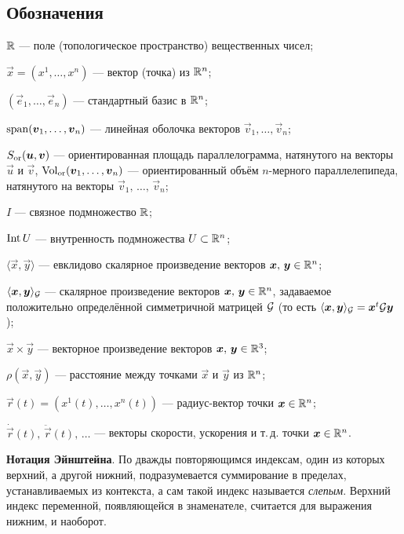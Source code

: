 \subsection*{Обозначения}

\begin{center}
\begin{minipage}{.9\textwidth}
	$\mathbb{R}$ --- поле (топологическое пространство) вещественных чисел;

	$\vec{x} = (x^1, \ldots, x^n)$ --- вектор (точка) из $\mathbb{R}^n$;
	
	$(\vec{e}_1, \ldots, \vec{e}_n)$ --- стандартный базис в $\mathbb{R}^n$;

	$\operatorname{span}(\boldsymbol{v}_1, \ldots, \boldsymbol{v}_n)$ --- линейная оболочка векторов $\vec{v}_1, \ldots, \vec{v}_n$;

	$S_{\mathrm{or}}(\boldsymbol{u}, \boldsymbol{v})$ --- ориентированная площадь параллелограмма, натянутого на векторы $\vec{u}$ и $\vec{v}$, $\operatorname{Vol}_{\mathrm{or}}(\boldsymbol{v}_1, \ldots, \boldsymbol{v}_n)$ --- ориентированный объём $n$-мерного параллелепипеда, натянутого на векторы $\vec{v}_1,\,\ldots,\,\vec{v}_n$;

	$I$ --- связное подмножество $\mathbb{R}$;

	$\operatorname{Int} U$ --- внутренность подмножества $U \subset \mathbb{R}^n$;

	$\langle\vec{x}, \vec{y}\rangle$ --- евклидово скалярное произведение векторов $\boldsymbol{x},\,\boldsymbol{y} \in \mathbb{R}^n$;

	$\langle\boldsymbol{x}, \boldsymbol{y}\rangle_{\mathcal{G}}$ --- скалярное произведение векторов $\boldsymbol{x},\,\boldsymbol{y} \in \mathbb{R}^n$, задаваемое положительно определённой симметричной матрицей $\mathcal{G}$ (то есть $\langle\boldsymbol{x}, \boldsymbol{y}\rangle_{\mathcal{G}} = \boldsymbol{x}^t\mathcal{G}\boldsymbol{y}$);

	$\vec{x} \times \vec{y}$ --- векторное произведение векторов $\boldsymbol{x},\,\boldsymbol{y} \in \mathbb{R}^3$;

	$\rho(\vec{x}, \vec{y})$ --- расстояние между точками $\vec{x}$ и $\vec{y}$ из $\mathbb{R}^n$;

	$\vec{r}(t) = (x^1(t), \ldots, x^n(t))$ --- радиус-вектор точки $\boldsymbol{x} \in \mathbb{R}^n$;

	$\dot{\vec{r}}(t),\,\ddot{\vec{r}}(t),\,\ldots$ --- векторы скорости, ускорения и т.\,д. точки $\boldsymbol{x} \in \mathbb{R}^n$.

	\medskip
	\textbf{Нотация Эйнштейна}. {\small По дважды повторяющимся индексам, один из которых верхний, а другой нижний, подразумевается суммирование в пределах, устанавливаемых из контекста, а сам такой индекс называется \textit{слепым}. Верхний индекс переменной, появляющейся в знаменателе, считается для выражения нижним, и наоборот.}
\end{minipage}
\end{center}

